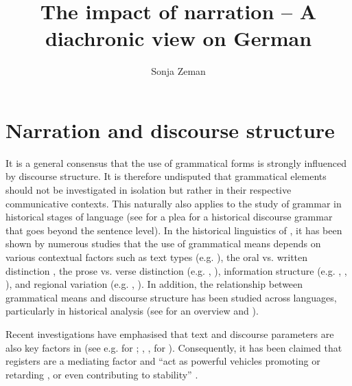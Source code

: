\documentclass[output=paper,colorlinks,citecolor=brown]{langscibook}
\author{Sonja Zeman\orcid{0000-0002-5923-670X}\affiliation{Universität Augsburg}}
\title{The impact of narration -- A diachronic view on German}
\begin{document}
\maketitle 
{}%

\section{Narration and discourse structure} \label{sec:zeman:1}

It is a general consensus that the use of grammatical forms is strongly influenced by discourse structure. It is therefore undisputed that grammatical elements should not be investigated in isolation but rather in their respective communicative contexts. This naturally also applies to the study of grammar in historical stages of language (see \citealt{Ziegler2010} for a plea for a historical discourse grammar that goes beyond the sentence level). In the historical linguistics of , it has been shown by numerous studies that the use of grammatical means depends on various contextual factors such as text types (e.g. \citealt{Gloning2010}), the oral vs. written distinction \citep{Elspaß2005,ÁgelHennig2006}, the prose vs. verse distinction (e.g. \citealt{Prell2005}, \citealt{Speyer2013}), information structure (e.g. \citealt{PetrovaSolf2005}, \citealt{Speyer2013}, \citealt{Demske2018}), and regional variation (e.g. \citealt{Elspaß2010}, \citealt{Werth2020}). In addition, the relationship between grammatical means and discourse structure has been studied across languages, particularly in historical  analysis (see for an overview \citealt{Kytö2019} and \citealt{GoulartEtAl2020}).

Recent investigations have emphasised that text and discourse parameters are also key factors in  (see e.g. \citealt{Hennig2009} for ; \citealt{BiberGray2013}, \citealt{BiberEtAl2021}, for ). Consequently, it has been claimed that registers are a mediating factor and “act as powerful vehicles promoting or retarding , or even contributing to stability” \citep[155]{Kytö2019}. 
\end{document}
